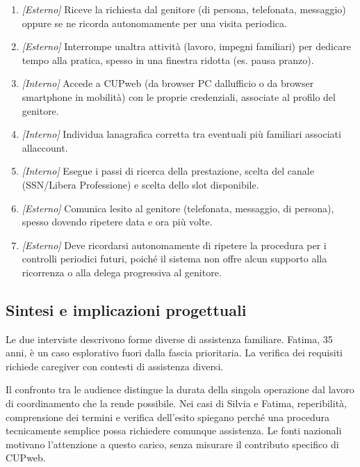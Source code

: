 \begin{enumerate}
\item
  \emph{[Esterno]} Riceve la richiesta dal genitore (di persona,
  telefonata, messaggio) oppure se ne ricorda autonomamente per una
  visita periodica.
\item
  \emph{[Esterno]} Interrompe un\textquotesingle altra attività
  (lavoro, impegni familiari) per dedicare tempo alla pratica, spesso in
  una finestra ridotta (es. pausa pranzo).
\item
  \emph{[Interno]} Accede a CUPweb (da browser PC dall\textquotesingle ufficio o da browser smartphone in mobilità) con le proprie
  credenziali, associate al profilo del genitore.
\item
  \emph{[Interno]} Individua l\textquotesingle anagrafica corretta tra
  eventuali più familiari associati all\textquotesingle account.
\item
  \emph{[Interno]} Esegue i passi di ricerca della prestazione, scelta
  del canale (SSN/Libera Professione) e scelta dello slot disponibile.
\item
  \emph{[Esterno]} Comunica l\textquotesingle esito al genitore
  (telefonata, messaggio, di persona), spesso dovendo ripetere data e
  ora più volte.
\item
  \emph{[Esterno]} Deve ricordarsi autonomamente di ripetere la
  procedura per i controlli periodici futuri, poiché il sistema non
  offre alcun supporto alla ricorrenza o alla delega progressiva al
  genitore.
\end{enumerate}

\subsection{Sintesi e implicazioni progettuali}


Le due interviste descrivono forme diverse di assistenza familiare.
Fatima, 35 anni, è un caso esplorativo fuori dalla fascia prioritaria.
La verifica dei requisiti richiede caregiver con contesti di assistenza diversi.


Il confronto tra le audience distingue la durata della singola operazione
dal lavoro di coordinamento che la rende possibile. Nei casi di Silvia e
Fatima, reperibilità, comprensione dei termini e verifica dell'esito
spiegano perché una procedura tecnicamente semplice possa richiedere
comunque assistenza. Le fonti nazionali motivano l'attenzione a questo
carico, senza misurare il contributo specifico di CUPweb.

